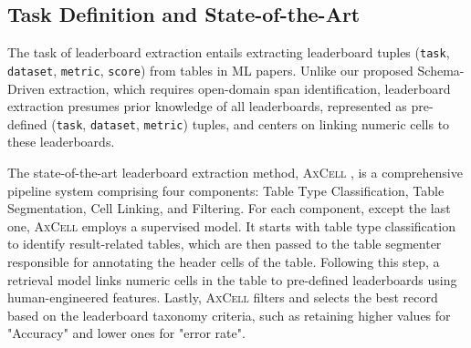 \documentclass[11pt]{article}
\newcommand\axcell{\textsc{AxCell}}
\begin{document}
{\subsection{Task Definition and State-of-the-Art}
The task of leaderboard extraction entails extracting leaderboard tuples (\texttt{task}, \texttt{dataset}, \texttt{metric}, \texttt{score}) from tables in ML papers. Unlike our proposed Schema-Driven extraction, which requires open-domain span identification, leaderboard extraction presumes prior knowledge of all leaderboards, represented as pre-defined (\texttt{task}, \texttt{dataset}, \texttt{metric}) tuples, and centers on linking numeric cells to these leaderboards. 

The state-of-the-art leaderboard extraction method, \axcell{} \cite{kardas-etal-2020-axcell}, is a comprehensive pipeline system comprising four components: Table Type Classification, Table Segmentation, Cell Linking, and Filtering. For each component, except the last one, \axcell{} employs a supervised model. It starts with table type classification to identify result-related tables, which are then passed to the table segmenter responsible for annotating the header cells of the table. Following this step, a retrieval model links numeric cells in the table to pre-defined leaderboards using human-engineered features. Lastly, \axcell{} filters and selects the best record based on the leaderboard taxonomy criteria, such as retaining higher values for "Accuracy" and lower ones for "error rate".

}
\end{document}
